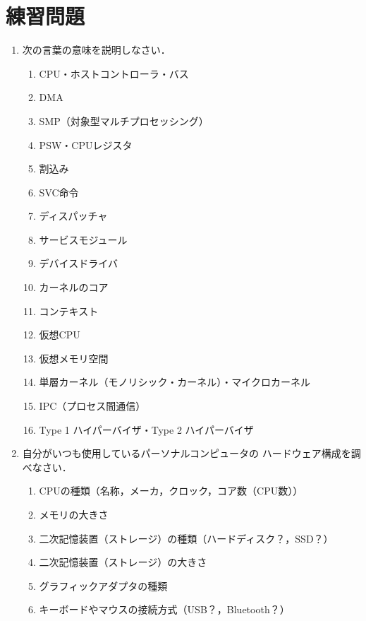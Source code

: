 \section*{練習問題}
\begin{enumerate}
  \renewcommand{\labelenumi}{\ttfamily\arabic{chapter}.\arabic{enumi}}
  \setlength{\leftskip}{1em}
\item 次の言葉の意味を説明しなさい．
  \begin{enumerate}
    \item CPU・ホストコントローラ・バス
    \item DMA
    \item SMP（対象型マルチプロセッシング）
    \item PSW・CPUレジスタ
    \item 割込み
    \item SVC命令
    \item ディスパッチャ
    \item サービスモジュール
    \item デバイスドライバ
    \item カーネルのコア
    \item コンテキスト
    \item 仮想CPU
    \item 仮想メモリ空間
    \item 単層カーネル（モノリシック・カーネル）・マイクロカーネル
    \item IPC（プロセス間通信）
    \item Type 1 ハイパーバイザ・Type 2 ハイパーバイザ
  \end{enumerate}
\item 自分がいつも使用しているパーソナルコンピュータの
  ハードウェア構成を調べなさい．
  \begin{enumerate}
    \item CPUの種類（名称，メーカ，クロック，コア数（CPU数））
    \item メモリの大きさ
    \item 二次記憶装置（ストレージ）の種類（ハードディスク？，SSD？）
    \item 二次記憶装置（ストレージ）の大きさ
    \item グラフィックアダプタの種類
    \item キーボードやマウスの接続方式（USB？，Bluetooth？）
  \end{enumerate}
\end{enumerate}

